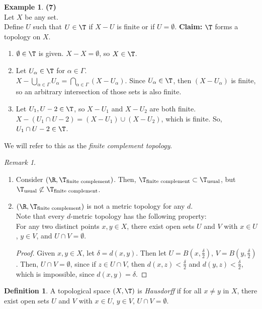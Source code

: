 \documentclass[a5paper]{article}
\theoremstyle{definition}%
\newtheorem*{definition*}{Definition}
\newtheorem*{example*}{Example}
\numberwithin{exercise}{section}
\theoremstyle{remark}%
\newtheorem*{remark*}{Remark}
\begin{document}
\begin{example*}\textbf{(7)}\\
Let $X$ be any set.\\
Define $U$ such that $U \in \T$ if $X-U$ is finite or if $U=\emptyset$.
\textbf{Claim:} $\T$ forms a topology on $X$. 
\begin{enumerate}
\item $\emptyset \in \T$ is given. $X-X=\emptyset$, so $X \in \T$. 
\item Let $U_\alpha \in \T$ for $\alpha \in \Gamma$.\\
$X-\bigcup_{\alpha \in \Gamma}U_\alpha=\bigcap_{\alpha \in \Gamma}(X-U_\alpha)$. Since $U_\alpha \in \T$, then $(X-U_\alpha)$ is finite, so an arbitrary intersection of those sets is also finite. 
\item Let $U_1, U-2 \in \T$, so $X-U_1$ and $X-U_2$ are both finite. \\
$X-(U_1 \cap U-2) = (X-U_1)\cup(X-U_2)$, which is finite. So, $U_1 \cap U-2 \in \T$. 
\end{enumerate}
We will refer to this as the \emph{finite complement topology}. 

\begin{remark*}\mbox{}
\begin{enumerate}
\item Consider $(\R, \T_{\text{finite complement}})$. Then, $\T_{\text{finite complement}} \subset \T_{\text{usual}}$, but $\T_{\text{usual}} \not\subset \T_{\text{finite complement}}$. 
\item $(\R, \T_{\text{finite complement}})$ is not a metric topology for any $d$. \\
Note that every $d$-metric topology has the following property:\\
For any two distinct points $x,y \in X$, there exist open sets $U$ and $V$ with $x \in U$, $y\in V$, and $U\cap V = \emptyset$. 
\begin{proof}
Given $x,y \in X$, let $\delta = d(x,y)$. Then let $U=B(x, \frac{\delta}{2})$, $V=B(y, \frac{\delta}{2})$. Then, $U\cap V= \emptyset$, since if $z\in U\cap V$, then $d(x,z)<\frac{\delta}{2}$ and $d(y,z)<\frac{\delta}{2}$, which is impossible, since $d(x,y)=\delta$. 
\end{proof}
\end{enumerate}
\end{remark*}
\end{example*}

\begin{definition*} A topological space $(X,\T)$ is \emph{Hausdorff} if for all $x\neq y$ in $X$, there exist open sets $U$ and $V$ with $x \in U$, $y \in V$, $U \cap V = \emptyset$. 
\end{definition*}
\end{document}

